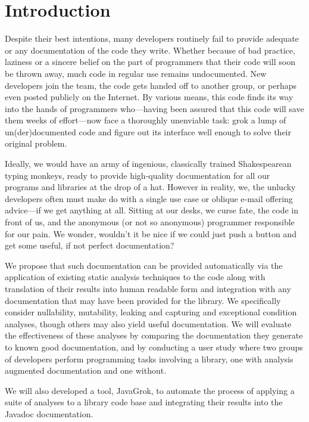 \section{Introduction}

Despite their best intentions, many developers routinely fail to provide
adequate or any documentation of the code they write.  Whether because of bad
practice, laziness or a sincere belief on the part of programmers that their
code will soon be thrown away, much code in regular use remains undocumented.
New developers join the team, the code gets handed off to another group, or
perhaps even posted publicly on the Internet.  By various means, this code
finds its way into the hands of programmers who---having been assured that this
code will save them weeks of effort---now face a thoroughly unenviable task:
grok a lump of un(der)documented code and figure out its interface well enough
to solve their original problem.

Ideally, we would have an army of ingenious, classically trained Shakespearean
typing monkeys, ready to provide high-quality documentation for all our
programs and libraries at the drop of a hat.  However in reality, we, the
unlucky developers often must make do with a single use case or oblique e-mail
offering advice---if we get anything at all.  Sitting at our desks, we curse
fate, the code in front of us, and the anonymous (or not so anonymous)
programmer responsible for our pain.  We wonder, wouldn't it be nice if we
could just push a button and get some useful, if not perfect documentation?

We propose that such documentation can be provided automatically via the
application of existing static analysis techniques to the code along with
translation of their results into human readable form and integration with any
documentation that may have been provided for the library. We specifically
consider nullability, mutability, leaking and capturing and exceptional
condition analyses, though others may also yield useful documentation. We will
evaluate the effectiveness of these analyses by comparing the documentation
they generate to known good documentation, and by conducting a user study where
two groups of developers perform programming tasks involving a library, one
with analysis augmented documentation and one without.

We will also developed a tool, JavaGrok, to automate the process of applying a
suite of analyses to a library code base and integrating their results into the
Javadoc documentation.
